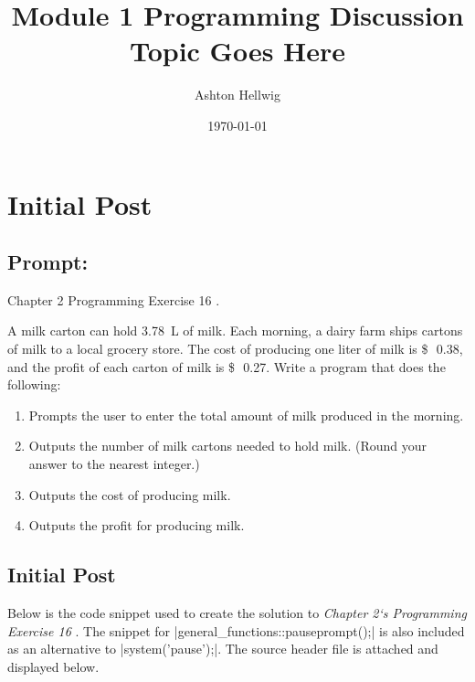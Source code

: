 \documentclass[a4paper, 11pt]{article}
\title{%
    Module 1 Programming Discussion\\%
    \large{Topic Goes Here}
  }
\author{Ashton Hellwig}
\date\today
\newcommand{\usd}[1]{\SI{#1}[\$\ensuremath{\,}]{}}
\begin{document}
  \maketitle
  \tableofcontents
  \listofalgorithms
  \newpage

  \section{Initial Post}
    \subsection{Prompt:}
      Chapter 2 Programming Exercise 16 \parencite[~\S2-16c]{textbook}.
      \begin{mdframed}[style=AnswerFrame,nobreak=true,align=center]
        A milk carton can hold \SI{3.78}{\liter} of milk. Each morning, a dairy
          farm ships cartons of milk to a local grocery store. The cost of
          producing one liter of milk is \usd{0.38}, and the profit of each
          carton of milk is \usd{0.27}. Write a program that does the following:

        \begin{enumerate}[label=\alph*.]
          \item Prompts the user to enter the total amount of milk produced in
            the morning.
          \item Outputs the number of milk cartons needed to hold milk.
            (Round your answer to the nearest integer.)
          \item Outputs the cost of producing milk.
          \item Outputs the profit for producing milk.
        \end{enumerate}
      \end{mdframed}

    \subsection{Initial Post}
      Below is the code snippet used to create the solution to \textit{Chapter
        2`s Programming Exercise 16} \parencite[~\S2-16c]{textbook}. The snippet
        for |general_functions::pauseprompt();| is also included as an
        alternative to |system('pause');|. The source header file is attached
        and displayed below.
\end{document}
